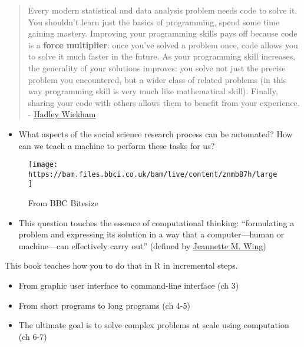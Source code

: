 \documentclass[
]{book}
\providecommand{\tightlist}{%
  \setlength{\itemsep}{0pt}\setlength{\parskip}{0pt}}
\begin{document}
\begin{quote}
Every modern statistical and data analysis problem needs code to solve it. You shouldn't learn just the basics of programming, spend some time gaining mastery. Improving your programming skills pays off because code is a \textbf{force multiplier}: once you've solved a problem once, code allows you to solve it much faster in the future. As your programming skill increases, the generality of your solutions improves: you solve not just the precise problem you encountered, but a wider class of related problems (in this way programming skill is very much like mathematical skill). Finally, sharing your code with others allows them to benefit from your experience. - \href{https://imstat.org/2014/12/16/hadley-wickham-impact-the-world-by-being-useful/}{Hadley Wickham}
\end{quote}

\begin{itemize}
\tightlist
\item
  What aspects of the social science research process can be automated? How can we teach a machine to perform these tasks for us?
\end{itemize}

\begin{figure}
\centering
\texttt{[image: https://bam.files.bbci.co.uk/bam/live/content/znmb87h/large]}
\caption{From BBC Bitesize}
\end{figure}

\begin{itemize}
\tightlist
\item
  This question touches the essence of computational thinking: ``formulating a problem and expressing its solution in a way that a computer---human or machine---can effectively carry out'' (defined by \href{http://www.cs.cmu.edu/afs/cs/usr/wing/www/publications/Wing06.pdf}{Jeannette M. Wing})
\end{itemize}

This book teaches how you to do that in R in incremental steps.

\begin{itemize}
\item
  From graphic user interface to command-line interface (ch 3)
\item
  From short programs to long programs (ch 4-5)
\item
  The ultimate goal is to solve complex problems at scale using computation (ch 6-7)
\end{itemize}
\end{document}
